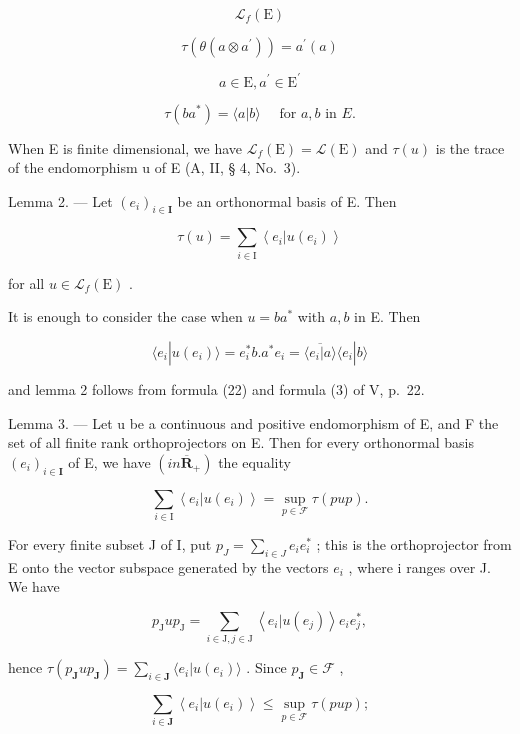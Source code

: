 \[
\mathcal {L} _ {f} (\mathrm{E})
\]

\[
\tau (\theta (a \otimes a ^ {\prime})) = a ^ {\prime} (a)
\]

\[
a \in \mathrm{E}, a ^ {\prime} \in \mathrm{E} ^ {\prime}\tag{22}
\]

\[
\tau (b a ^ {*}) = \langle a | b \rangle \quad \text { for } a, b \text { in } E.
\]

When E is finite dimensional, we have \(\mathcal{L}_{f}(\mathrm{E}) = \mathcal{L}(\mathrm{E})\) and \(\tau(u)\) is the trace of the endomorphism u of E (A, II, § 4, No.~3).

Lemma 2. --- Let \((e_i)_{i\in \mathbf{I}}\) be an orthonormal basis of E. Then

\[
\tau (u) = \sum_ {i \in \mathrm{I}} \left\langle e _ {i} | u (e _ {i}) \right\rangle
\]

for all \(u \in \mathcal{L}_f(\mathrm{E})\) .

It is enough to consider the case when \(u = ba^{*}\) with \(a, b\) in E. Then

\[
\langle e _ {i} | u (e _ {i}) \rangle = e _ {i} ^ {*} b. a ^ {*} e _ {i} = \overline {{\langle e _ {i} | a \rangle}} \langle e _ {i} | b \rangle
\]

and lemma 2 follows from formula (22) and formula (3) of V, p.~22.

Lemma 3. --- Let u be a continuous and positive endomorphism of E, and F the set of all finite rank orthoprojectors on E. Then for every orthonormal basis \((e_{i})_{i\in\mathbf{I}}\) of E, we have \((in\overline{\mathbf{R}}_{+})\) the equality

\[
\sum_ {i \in \mathrm{I}} \left\langle e _ {i} | u (e _ {i}) \right\rangle = \sup _ {p \in \mathcal {F}} \tau (p u p).
\]

For every finite subset J of I, put \(p_{J} = \sum_{i \in J} e_{i} e_{i}^{*}\) ; this is the orthoprojector from E onto the vector subspace generated by the vectors \(e_{i}\) , where i ranges over J. We have

\[
p _ {\mathrm{J}} u p _ {\mathrm{J}} = \sum_ {i \in \mathrm{J}, j \in \mathrm{J}} \left\langle e _ {i} | u (e _ {j}) \right\rangle e _ {i} e _ {j} ^ {*},
\]

hence \(\tau(p_{\mathbf{J}}up_{\mathbf{J}}) = \sum_{i\in \mathbf{J}}\langle e_i|u(e_i)\rangle\) . Since \(p_{\mathbf{J}}\in \mathcal{F}\) ,

\[
\sum_ {i \in \mathbf {J}} \left\langle e _ {i} | u (e _ {i}) \right\rangle \leqslant \sup _ {p \in \mathcal {F}} \tau (p u p);
\]


